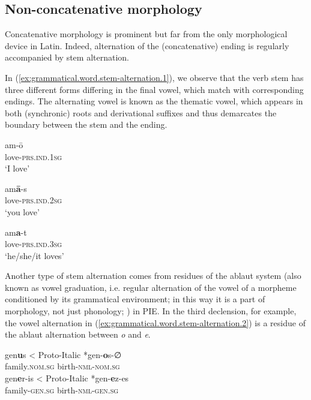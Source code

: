 \documentclass[a4paper, oneside, 12pt]{report}
\newcommand*{\citepage}[1]{p.~{#1}}
\newcommand{\form}[1]{\emph{#1}}
\newcommand*{\category}[1]{\textsc{#1}}
\newcommand{\translate}[1]{`#1'}
\begin{document}
\subsection{Non-concatenative morphology}\label{sec:grammatical.word.non-concatenative}

Concatenative morphology is prominent but far from the only morphological device in Latin.
Indeed, alternation of the (concatenative) ending is regularly accompanied by stem alternation.

In (\ref{ex:grammatical.word.stem-alternation.1}), we observe that the verb stem has three different forms differing in the final vowel, which match with corresponding endings. 
The alternating vowel is known as the thematic vowel, which appears in both (synchronic) roots and derivational suffixes
and thus demarcates the boundary between the stem and the ending.

\begin{exe}
    \ex\label{ex:grammatical.word.stem-alternation.1} \begin{xlist}
        \ex 
        \gll am-ō \\ 
        love-\category{prs.ind.1sg} \\ 
        \glt\translate{I love}

        \ex 
        \gll am\textbf{ā}-s \\ 
        love-\category{prs.ind.2sg} \\ 
        \glt\translate{you love}

        \ex 
        \gll am\textbf{a}-t \\ 
        love-\category{prs.ind.3sg} \\ 
        \glt\translate{he/she/it loves}
    \end{xlist}
\end{exe}

Another type of stem alternation comes from residues of the ablaut system (also known as vowel graduation, i.e. regular alternation of the vowel of a morpheme conditioned by its grammatical environment; in this way it is a part of morphology, not just phonology; \citealt[\citepage{46}]{weiss2009outline}) in PIE. 
In the third declension, for example,
the vowel alternation in (\ref{ex:grammatical.word.stem-alternation.2})
is a residue of the ablaut alternation between \form{o} and \form{e}.

\begin{exe}
    \ex\label{ex:grammatical.word.stem-alternation.2}
    \begin{xlist}
        \ex \gll gen\textbf{u}s < Proto-Italic *gen-\textbf{o}s-∅  \\ 
         family.\category{nom.sg} {} {} birth-\category{nml}-\category{nom.sg} \\ 
        \ex \gll gen\textbf{e}r-is < Proto-Italic *gen-\textbf{e}z-es \\ 
        family-\category{gen.sg}  {} {} birth-\category{nml}-\category{gen.sg} \\ 
    \end{xlist} 
\end{exe}
\end{document}
